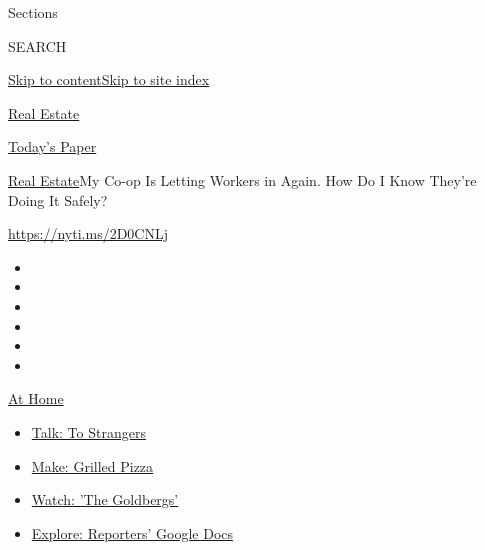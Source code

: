 Sections

SEARCH

\protect\hyperlink{site-content}{Skip to
content}\protect\hyperlink{site-index}{Skip to site index}

\href{https://www.nytimes3xbfgragh.onion/section/realestate}{Real
Estate}

\href{https://myaccount.nytimes3xbfgragh.onion/auth/login?response_type=cookie\&client_id=vi}{}

\href{https://www.nytimes3xbfgragh.onion/section/todayspaper}{Today's
Paper}

\href{/section/realestate}{Real Estate}\textbar{}My Co-op Is Letting
Workers in Again. How Do I Know They're Doing It Safely?

\url{https://nyti.ms/2D0CNLj}

\begin{itemize}
\item
\item
\item
\item
\item
\item
\end{itemize}

\href{https://www.nytimes3xbfgragh.onion/spotlight/at-home?action=click\&pgtype=Article\&state=default\&region=TOP_BANNER\&context=at_home_menu}{At
Home}

\begin{itemize}
\tightlist
\item
  \href{https://www.nytimes3xbfgragh.onion/2020/08/03/well/family/the-benefits-of-talking-to-strangers.html?action=click\&pgtype=Article\&state=default\&region=TOP_BANNER\&context=at_home_menu}{Talk:
  To Strangers}
\item
  \href{https://www.nytimes3xbfgragh.onion/2020/08/01/at-home/coronavirus-make-pizza-on-a-grill.html?action=click\&pgtype=Article\&state=default\&region=TOP_BANNER\&context=at_home_menu}{Make:
  Grilled Pizza}
\item
  \href{https://www.nytimes3xbfgragh.onion/2020/07/31/arts/television/goldbergs-abc-stream.html?action=click\&pgtype=Article\&state=default\&region=TOP_BANNER\&context=at_home_menu}{Watch:
  'The Goldbergs'}
\item
  \href{https://www.nytimes3xbfgragh.onion/interactive/2020/at-home/even-more-reporters-editors-diaries-lists-recommendations.html?action=click\&pgtype=Article\&state=default\&region=TOP_BANNER\&context=at_home_menu}{Explore:
  Reporters' Google Docs}
\end{itemize}

